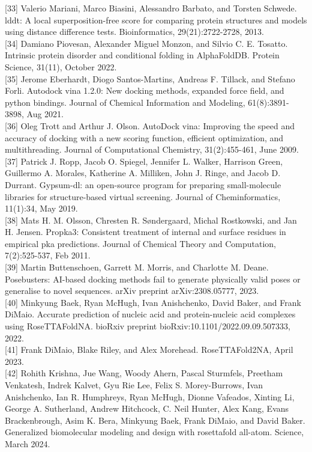 \documentclass[10pt]{article}
\begin{document}
[33] Valerio Mariani, Marco Biasini, Alessandro Barbato, and Torsten Schwede. lddt: A local superposition-free score for comparing protein structures and models using distance difference tests. Bioinformatics, 29(21):2722-2728, 2013.\\[0pt]
[34] Damiano Piovesan, Alexander Miguel Monzon, and Silvio C. E. Tosatto. Intrinsic protein disorder and conditional folding in AlphaFoldDB. Protein Science, 31(11), October 2022.\\[0pt]
[35] Jerome Eberhardt, Diogo Santos-Martins, Andreas F. Tillack, and Stefano Forli. Autodock vina 1.2.0: New docking methods, expanded force field, and python bindings. Journal of Chemical Information and Modeling, 61(8):3891-3898, Aug 2021.\\[0pt]
[36] Oleg Trott and Arthur J. Olson. AutoDock vina: Improving the speed and accuracy of docking with a new scoring function, efficient optimization, and multithreading. Journal of Computational Chemistry, 31(2):455-461, June 2009.\\[0pt]
[37] Patrick J. Ropp, Jacob O. Spiegel, Jennifer L. Walker, Harrison Green, Guillermo A. Morales, Katherine A. Milliken, John J. Ringe, and Jacob D. Durrant. Gypsum-dl: an open-source program for preparing small-molecule libraries for structure-based virtual screening. Journal of Cheminformatics, 11(1):34, May 2019.\\[0pt]
[38] Mats H. M. Olsson, Chresten R. Søndergaard, Michal Rostkowski, and Jan H. Jensen. Propka3: Consistent treatment of internal and surface residues in empirical pka predictions. Journal of Chemical Theory and Computation, 7(2):525-537, Feb 2011.\\[0pt]
[39] Martin Buttenschoen, Garrett M. Morris, and Charlotte M. Deane. Posebusters: AI-based docking methods fail to generate physically valid poses or generalise to novel sequences. arXiv preprint arXiv:2308.05777, 2023.\\[0pt]
[40] Minkyung Baek, Ryan McHugh, Ivan Anishchenko, David Baker, and Frank DiMaio. Accurate prediction of nucleic acid and protein-nucleic acid complexes using RoseTTAFoldNA. bioRxiv preprint bioRxiv:10.1101/2022.09.09.507333, 2022.\\[0pt]
[41] Frank DiMaio, Blake Riley, and Alex Morehead. RoseTTAFold2NA, April 2023.\\[0pt]
[42] Rohith Krishna, Jue Wang, Woody Ahern, Pascal Sturmfels, Preetham Venkatesh, Indrek Kalvet, Gyu Rie Lee, Felix S. Morey-Burrows, Ivan Anishchenko, Ian R. Humphreys, Ryan McHugh, Dionne Vafeados, Xinting Li, George A. Sutherland, Andrew Hitchcock, C. Neil Hunter, Alex Kang, Evans Brackenbrough, Asim K. Bera, Minkyung Baek, Frank DiMaio, and David Baker. Generalized biomolecular modeling and design with rosettafold all-atom. Science, March 2024.
\end{document}
